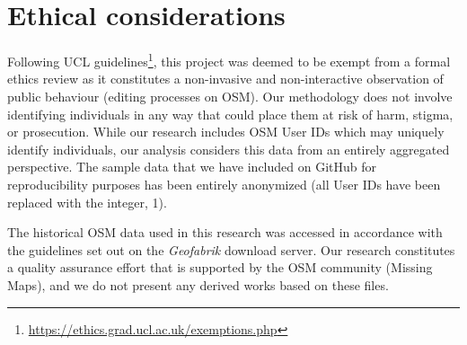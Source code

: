 \section{Ethical considerations}

Following UCL guidelines\footnote{\url{https://ethics.grad.ucl.ac.uk/exemptions.php}}, this project was deemed to be exempt from a formal ethics review as it constitutes a non-invasive and non-interactive observation of public behaviour (editing processes on OSM). Our methodology does not involve identifying individuals in any way that could place them at risk of harm, stigma, or prosecution. While our research includes OSM User IDs which may uniquely identify individuals, our analysis considers this data from an entirely aggregated perspective. The sample data that we have included on GitHub for reproducibility purposes has been entirely anonymized (all User IDs have been replaced with the integer, 1). 

The historical OSM data used in this research was accessed in accordance with the guidelines set out on the \textit{Geofabrik} download server. Our research constitutes a quality assurance effort that is supported by the OSM community (Missing Maps), and we do not present any derived works based on these files. 


